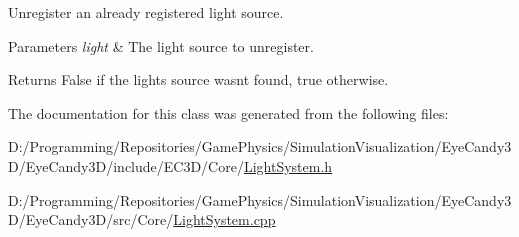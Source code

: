 Unregister an already registered light source. 


\begin{DoxyParams}{Parameters}
{\em light} & The light source to unregister. \\
\hline
\end{DoxyParams}
\begin{DoxyReturn}{Returns}
False if the lights source wasn\textquotesingle{}t found, true otherwise. 
\end{DoxyReturn}


The documentation for this class was generated from the following files\+:\begin{DoxyCompactItemize}
\item 
D\+:/\+Programming/\+Repositories/\+Game\+Physics/\+Simulation\+Visualization/\+Eye\+Candy3\+D/\+Eye\+Candy3\+D/include/\+E\+C3\+D/\+Core/\mbox{\hyperlink{_light_system_8h}{Light\+System.\+h}}\item 
D\+:/\+Programming/\+Repositories/\+Game\+Physics/\+Simulation\+Visualization/\+Eye\+Candy3\+D/\+Eye\+Candy3\+D/src/\+Core/\mbox{\hyperlink{_light_system_8cpp}{Light\+System.\+cpp}}\end{DoxyCompactItemize}
